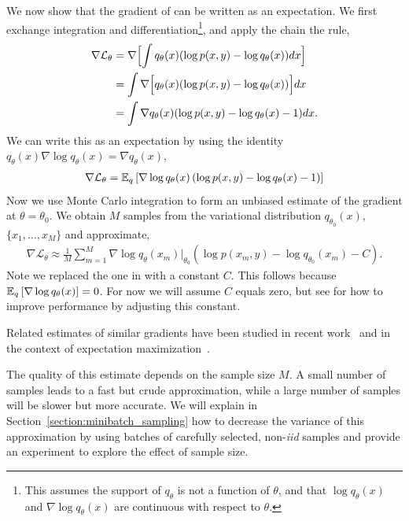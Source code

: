 We now show that the gradient of
 can be written as an
expectation.  We first exchange integration and
differentiation\footnote{This assumes the support of $q_\theta$ is not
  a function of $\theta$, and that $\log q_\theta(x)$ and $\nabla \log
  q_\theta(x)$ are continuous with respect to $\theta$.}, and apply
the chain the rule,
\begin{align}
 \nabla \mathcal{L}_\theta &= \nabla \Bigl[
  \int q_{\theta}(x) (\log p(x, y) - \log q_{\theta}(x))
  dx \Bigr] \\ \nonumber
  & = \int \nabla \Bigl[ q_{\theta}(x) (\log p(x, y) - \log
     q_{\theta}(x)) \Bigr] dx  \\ \nonumber
     &= \int \nabla q_{\theta}(x) (
     \log p(x, y) - \log q_{\theta}(x) - 1) dx.
\end{align}
We can write this as an expectation by using the identity
$q_\theta(x) \nabla \log q_\theta(x) = \nabla q_\theta(x)$,
\begin{align}
  \label{equation:gradient-as-expectation}
  \nabla \mathcal{L}_\theta =
  \mathbb{E}_q\left[\nabla \log q_\theta(x) \left(\log p(x,y) - \log
      q_{\theta}(x) - 1 \right)\right]
\end{align}
Now we use Monte Carlo integration to form an unbiased estimate of the
gradient at $\theta = \theta_0$.  We obtain $M$ samples from the
variational distribution $q_{\theta_0}(x)$, $\{x_{1}, \ldots, x_{M}\}$
and approximate,
\begin{align}
  \label{equation:svo_gradient}
  \nabla \mathcal{L}_\theta \approx \frac{1}{M} \sum_{m=1}^M
  \nabla \log q_{\theta}(x_{m}) \Bigr|_{\theta_0}
  (\log p(x_{m} , y) - \log q_{\theta_0}(x_{m}) - C).
\end{align}
Note we replaced the one in  with a
constant $C$.  This follows because $\mathbb{E}_q\left[\nabla \log q_\theta(x)\right]
= 0$.  For now we will assume $C$ equals zero, but see
 for how to improve performance by adjusting this
constant.

Related estimates of similar gradients have been studied in
recent work~\cite{carbonetto:2009,graves:2011} and in the context of
expectation maximization~\cite{wei:1990}.

The quality of this estimate depends on the sample size $M$.  A small
number of samples leads to a fast but crude approximation, while a
large number of samples will be slower but more accurate.  We will
explain in Section~\ref{section:minibatch_sampling} how to decrease
the variance of this approximation by using batches of carefully
selected, non-\emph{iid} samples and provide an experiment to explore
the effect of sample size.


